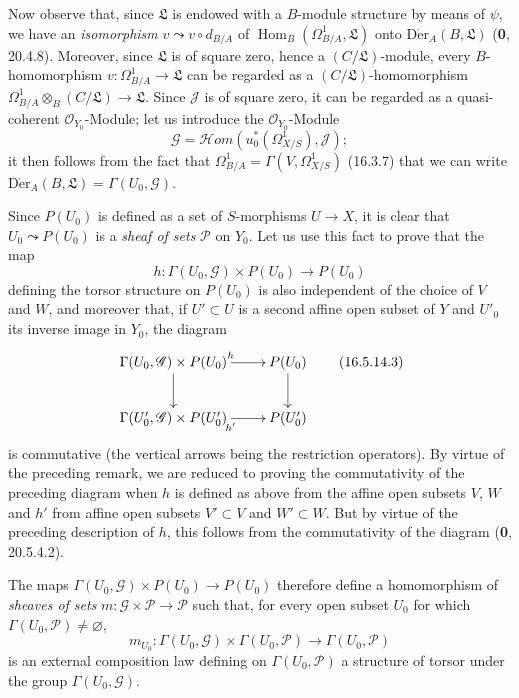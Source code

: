 \begin{env}[16.5.14]
Now observe that, since $\mathfrak{L}$ is endowed with a
$B$-module structure by means of $\psi$, we have an \emph{isomorphism}
$v\leadsto v\circ d_{B/A}$ of
$\operatorname{Hom}_B(\Omega_{B/A}^1,\mathfrak{L})$ onto
$\operatorname{D\acute{e}r}_A(B,\mathfrak{L})$ (\textbf{0}, 20.4.8). Moreover, since
$\mathfrak{L}$ is of square zero, hence a $(C/\mathfrak{L})$-module, every
$B$-homomorphism $v:\Omega_{B/A}^1\to\mathfrak{L}$ can be regarded
as a $(C/\mathfrak{L})$-homomorphism
$\Omega_{B/A}^1\otimes_B(C/\mathfrak{L})\to\mathfrak{L}$. Since
$\mathscr{J}$ is of square zero, it can be regarded as a quasi-coherent
$\mathcal{O}_{Y_0}$-Module; let us introduce the
$\mathcal{O}_{Y_0}$-Module
\[
  \mathscr{G}=\mathscr{H}om(u_0^*(\varOmega_{X/S}^1),\mathscr{J});
  \tag{16.5.14.2}
  \label{IV.16.5.14.2}
\]
it then follows from the fact that
$\Omega_{B/A}^1=\Gamma(V,\varOmega_{X/S}^1)$ (16.3.7) that we can write
$\operatorname{D\acute{e}r}_A(B,\mathfrak{L})=\Gamma(U_0,\mathscr{G})$.

Since $P(U_0)$ is defined as a set of $S$-morphisms $U\to X$, it is
clear that $U_0\leadsto P(U_0)$ is a \emph{sheaf of sets}
$\mathscr{P}$ on $Y_0$. Let us use this fact to prove that the map
\[
  h:\Gamma(U_0,\mathscr{G})\times P(U_0)\longrightarrow P(U_0)
\]
defining the torsor structure on $P(U_0)$ is also independent of the
choice of $V$ and $W$, and moreover that, if $U'\subset U$ is a second affine
open subset of $Y$ and $U'_0$ its inverse image in $Y_0$, the diagram
\[
  \xymatrix{
    \Gamma(U_0,\mathscr{G})\times P(U_0)\ar[d]\ar[r]^h
      & P(U_0)\ar[d]\\
    \Gamma(U'_0,\mathscr{G})\times P(U'_0)\ar[r]_{h'}
      & P(U'_0)
  }
  \tag{16.5.14.3}
  \label{IV.16.5.14.3}
\]
is commutative (the vertical arrows being the restriction operators).
By virtue of the preceding remark, we are reduced to proving the commutativity
of the preceding diagram when $h$ is defined as above from the
affine open subsets $V$, $W$ and $h'$ from affine open
subsets $V'\subset V$ and $W'\subset W$. But by virtue of the preceding
description of $h$, this follows from the commutativity of the diagram
(\textbf{0}, 20.5.4.2).

The maps
$\Gamma(U_0,\mathscr{G})\times P(U_0)\to P(U_0)$ therefore define a
homomorphism of \emph{sheaves of sets}
$m:\mathscr{G}\times\mathscr{P}\to\mathscr{P}$ such that, for every open subset
$U_0$ for which $\Gamma(U_0,\mathscr{P})\neq\varnothing$,
\[
  m_{U_0}:\Gamma(U_0,\mathscr{G})\times\Gamma(U_0,\mathscr{P})
  \longrightarrow\Gamma(U_0,\mathscr{P})
\]
is an external composition law defining on $\Gamma(U_0,\mathscr{P})$ a
structure of torsor under the group $\Gamma(U_0,\mathscr{G})$.
\end{env}

